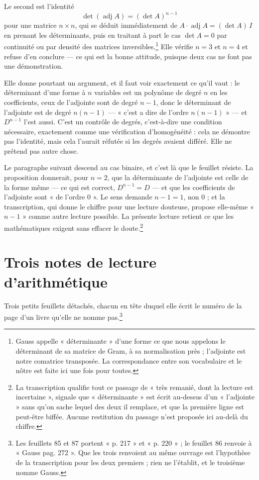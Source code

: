 \documentclass[11pt,a4paper]{article}
\begin{document}
Le second est l'identité
\[
  \det\left(\operatorname{adj} A\right) = \left(\det A\right)^{n-1}
\]
pour une matrice $n \times n$, qui se déduit immédiatement de
$A \cdot \operatorname{adj} A = (\det A)\,I$ en prenant les déterminants,
puis en traitant à part le cas $\det A = 0$ par continuité ou par densité des
matrices inversibles.\footnote{Gauss appelle « déterminante » d'une forme ce
que nous appelons le déterminant de sa matrice de Gram, à sa normalisation
près ; l'adjointe est notre comatrice transposée. La correspondance entre son
vocabulaire et le nôtre est faite ici une fois pour toutes.} Elle vérifie
$n = 3$ et $n = 4$ et refuse d'en conclure — ce qui est la bonne attitude,
puisque deux cas ne font pas une démonstration.

Elle donne pourtant un argument, et il faut voir exactement ce qu'il vaut : le
déterminant d'une forme à $n$ variables est un polynôme de degré $n$ en les
coefficients, ceux de l'adjointe sont de degré $n-1$, donc le déterminant de
l'adjointe est de degré $n(n-1)$ — « c'est a dire de l'ordre $n(n-1)$ » — et
$D^{n-1}$ l'est aussi. C'est un contrôle de degrés, c'est-à-dire une condition
nécessaire, exactement comme une vérification d'homogénéité : cela ne démontre
pas l'identité, mais cela l'aurait réfutée si les degrés avaient différé. Elle
ne prétend pas autre chose.

Le paragraphe suivant descend au cas binaire, et c'est là que le feuillet
résiste. La proposition donnerait, pour $n = 2$, que la déterminante de
l'adjointe est celle de la forme même — ce qui est correct, $D^{n-1} = D$ — et
que les coefficients de l'adjointe sont « de l'ordre $0$ ». Le sens demande
$n - 1 = 1$, non 0 ; et la transcription, qui donne le chiffre pour une lecture
douteuse, propose elle-même « $n-1$ » comme autre lecture possible. La présente
lecture retient ce que les mathématiques exigent sans effacer le
doute.\footnote{La transcription qualifie tout ce passage de « très remanié,
dont la lecture est incertaine », signale que « déterminante » est écrit
au-dessus d'un « l'adjointe » sans qu'on sache lequel des deux il remplace, et
que la première ligne est peut-être biffée. Aucune restitution du passage n'est
proposée ici au-delà du chiffre.}

\section*{Trois notes de lecture d'arithmétique}

Trois petits feuillets détachés, chacun en tête duquel elle écrit le numéro de
la page d'un livre qu'elle ne nomme pas.\footnote{Les feuillets 85 et 87
portent « p. 217 » et « p. 220 » ; le feuillet 86 renvoie à « Gauss pag. 272 ».
Que les trois renvoient au même ouvrage est l'hypothèse de la transcription
pour les deux premiers ; rien ne l'établit, et le troisième nomme Gauss.}
\end{document}
